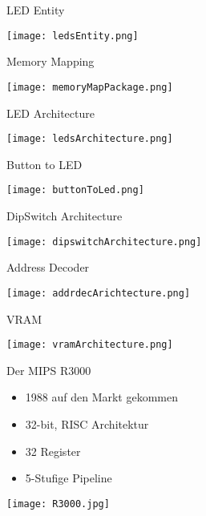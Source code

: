 \begin{frame}{LED Entity}
\begin{center}
\texttt{[image: ledsEntity.png]}
\end{center} 
\end{frame}

\begin{frame}{Memory Mapping}
\begin{center}
\texttt{[image: memoryMapPackage.png]}
\end{center} 
\end{frame}

\begin{frame}{LED Architecture}
\begin{center}
\texttt{[image: ledsArchitecture.png]}
\end{center} 
\end{frame}

\begin{frame}{Button to LED}
\begin{center}
\texttt{[image: buttonToLed.png]}
\end{center} 
\end{frame}

\begin{frame}{DipSwitch Architecture}
\begin{center}
\texttt{[image: dipswitchArchitecture.png]}
\end{center} 
\end{frame}

\begin{frame}{Address Decoder}
\begin{center}
\texttt{[image: addrdecArichtecture.png]}
\end{center} 
\end{frame}

\begin{frame}{VRAM}
\begin{center}
\texttt{[image: vramArchitecture.png]}
\end{center} 
\end{frame}

\begin{frame}{Der MIPS R3000}
\begin{itemize}
       \item 1988 auf den Markt gekommen
       \item 32-bit, RISC Architektur
		\item 32 Register
		\item 5-Stufige Pipeline
\end{itemize}

\begin{center}
\texttt{[image: R3000.jpg]}
\end{center}

\end{frame}


